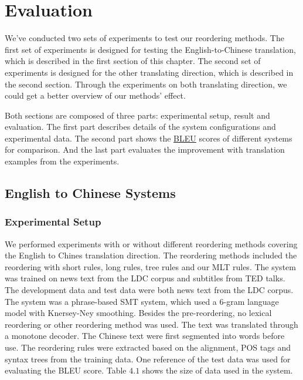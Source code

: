 
\chapter{Evaluation}
\label{ch:Evaluation}

We've conducted two sets of experiments to test our reordering methods. The first set of experiments is designed for testing the English-to-Chinese translation, which is described in the first section of this chapter. The second set of experiments is designed for the other translating direction, which is described in the second section. Through the experiments on both translating direction, we could get a better overview of our methods' effect.

Both sections are composed of three parts: experimental setup, result and evaluation. The first part describes details of the system configurations and experimental data. The second part shows the \hyperref[ch:Foundations:sec:bleu]{BLEU} scores of different systems for comparison. And the last part evaluates the improvement with translation examples from the experiments.


\section{English to Chinese Systems}
\label{ch:Evaluation:sec:enw}

\subsection{Experimental Setup}
We performed experiments with or without different reordering methods covering the English to Chines translation direction. The reordering methods included the reordering with short rules, long rules, tree rules and our MLT rules. The system was trained on news text from the LDC corpus and subtitles from TED talks. The development data and test data were both news text from the LDC corpus. The system was a phrase-based SMT system, which used a 6-gram language model with Knersey-Ney smoothing. Besides the pre-reordering, no lexical reordering or other reordering method was used. The text was translated through a monotone decoder. The Chinese text were first segmented into words before use.
The reordering rules were extracted based on the alignment, POS tags and syntax trees from the training data. One reference of the test data was used for evaluating the BLEU score. Table $4.1$ shows the size of data used in the system. %

